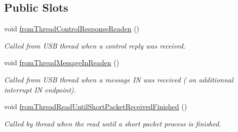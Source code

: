 \subsection*{Public Slots}
\begin{DoxyCompactItemize}
\item 
void \hyperlink{classmdt_usb_port_manager_af043c75c74665b23d13f3cb73150935c}{fromThreadControlResponseReaden} ()
\begin{DoxyCompactList}\small\item\em Called from USB thread when a control reply was received. \end{DoxyCompactList}\item 
\hypertarget{classmdt_usb_port_manager_a9b7154590a4eb267aff4e11ba53dd7aa}{
void \hyperlink{classmdt_usb_port_manager_a9b7154590a4eb267aff4e11ba53dd7aa}{fromThreadMessageInReaden} ()}
\label{classmdt_usb_port_manager_a9b7154590a4eb267aff4e11ba53dd7aa}

\begin{DoxyCompactList}\small\item\em Called from USB thread when a message IN was received ( on additionnal interrupt IN endpoint). \end{DoxyCompactList}\item 
\hypertarget{classmdt_usb_port_manager_a8f53dc5445b7f8f4a077f3cc25880b5d}{
void \hyperlink{classmdt_usb_port_manager_a8f53dc5445b7f8f4a077f3cc25880b5d}{fromThreadReadUntilShortPacketReceivedFinished} ()}
\label{classmdt_usb_port_manager_a8f53dc5445b7f8f4a077f3cc25880b5d}

\begin{DoxyCompactList}\small\item\em Called by thread when the read until a short packet process is finished. \end{DoxyCompactList}\end{DoxyCompactItemize}
